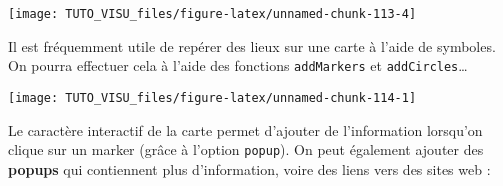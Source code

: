 \documentclass[]{article}
\newenvironment{Shaded}{\begin{snugshade}}{\end{snugshade}}
\newcommand{\DataTypeTok}[1]{\textcolor[rgb]{0.13,0.29,0.53}{#1}}
\newcommand{\DecValTok}[1]{\textcolor[rgb]{0.00,0.00,0.81}{#1}}
\newcommand{\ErrorTok}[1]{\textcolor[rgb]{0.64,0.00,0.00}{\textbf{#1}}}
\newcommand{\FloatTok}[1]{\textcolor[rgb]{0.00,0.00,0.81}{#1}}
\newcommand{\KeywordTok}[1]{\textcolor[rgb]{0.13,0.29,0.53}{\textbf{#1}}}
\newcommand{\NormalTok}[1]{#1}
\newcommand{\OperatorTok}[1]{\textcolor[rgb]{0.81,0.36,0.00}{\textbf{#1}}}
\newcommand{\OtherTok}[1]{\textcolor[rgb]{0.56,0.35,0.01}{#1}}
\newcommand{\StringTok}[1]{\textcolor[rgb]{0.31,0.60,0.02}{#1}}
\theoremstyle{definition}
\theoremstyle{definition}
\theoremstyle{definition}
\theoremstyle{remark}
\begin{document}
\begin{center}\texttt{[image: TUTO\_VISU\_files/figure-latex/unnamed-chunk-113-4]} \end{center}

Il est fréquemment utile de repérer des lieux sur une carte à l'aide de symboles. On pourra effectuer cela à l'aide des fonctions \texttt{addMarkers} et \texttt{addCircles}\ldots{}

\begin{Shaded}
\end{Shaded}

\begin{center}\texttt{[image: TUTO\_VISU\_files/figure-latex/unnamed-chunk-114-1]} \end{center}

Le caractère interactif de la carte permet d'ajouter de l'information lorsqu'on clique sur un marker (grâce à l'option \texttt{popup}). On peut également ajouter des \textbf{popups} qui contiennent plus d'information, voire des liens vers des sites web :

\begin{Shaded}
\end{Shaded}
\end{document}
